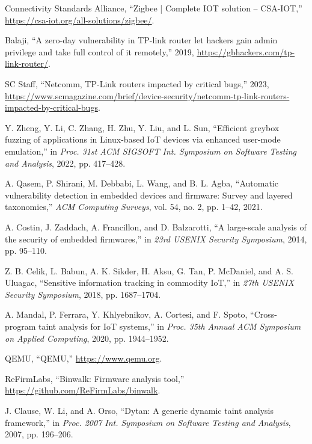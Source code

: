 {Connectivity Standards Alliance}, ``Zigbee | Complete IOT solution -- CSA-IOT,'' \url{https://csa-iot.org/all-solutions/zigbee/}.

Balaji, ``A zero-day vulnerability in TP-link router let hackers gain admin privilege and take full control of it remotely,'' 2019, \url{https://gbhackers.com/tp-link-router/}.

{SC Staff}, ``Netcomm, TP-Link routers impacted by critical bugs,'' 2023, \url{https://www.scmagazine.com/brief/device-security/netcomm-tp-link-routers-impacted-by-critical-bugs}.

Y. Zheng, Y. Li, C. Zhang, H. Zhu, Y. Liu, and L. Sun, ``Efficient greybox fuzzing of applications in Linux-based IoT devices via enhanced user-mode emulation,'' in \textit{Proc. 31st ACM SIGSOFT Int. Symposium on Software Testing and Analysis}, 2022, pp. 417--428.

A. Qasem, P. Shirani, M. Debbabi, L. Wang, and B. L. Agba, ``Automatic vulnerability detection in embedded devices and firmware: Survey and layered taxonomies,'' \textit{ACM Computing Surveys}, vol. 54, no. 2, pp. 1--42, 2021.

A. Costin, J. Zaddach, A. Francillon, and D. Balzarotti, ``A large-scale analysis of the security of embedded firmwares,'' in \textit{23rd USENIX Security Symposium}, 2014, pp. 95--110.

Z. B. Celik, L. Babun, A. K. Sikder, H. Aksu, G. Tan, P. McDaniel, and A. S. Uluagac, ``Sensitive information tracking in commodity IoT,'' in \textit{27th USENIX Security Symposium}, 2018, pp. 1687--1704.

A. Mandal, P. Ferrara, Y. Khlyebnikov, A. Cortesi, and F. Spoto, ``Cross-program taint analysis for IoT systems,'' in \textit{Proc. 35th Annual ACM Symposium on Applied Computing}, 2020, pp. 1944--1952.

{QEMU}, ``QEMU,'' \url{https://www.qemu.org}.

{ReFirmLabs}, ``Binwalk: Firmware analysis tool,'' \url{https://github.com/ReFirmLabs/binwalk}.

J. Clause, W. Li, and A. Orso, ``Dytan: A generic dynamic taint analysis framework,'' in \textit{Proc. 2007 Int. Symposium on Software Testing and Analysis}, 2007, pp. 196--206.

